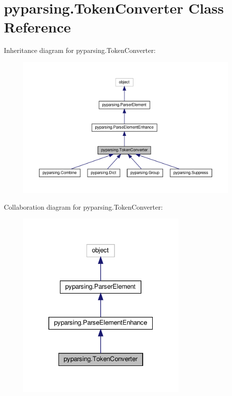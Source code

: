 \hypertarget{classpyparsing_1_1TokenConverter}{}\section{pyparsing.\+Token\+Converter Class Reference}
\label{classpyparsing_1_1TokenConverter}


Inheritance diagram for pyparsing.\+Token\+Converter\+:
\nopagebreak
\begin{figure}[H]
\begin{center}
\leavevmode
\includegraphics[width=350pt]{classpyparsing_1_1TokenConverter__inherit__graph}
\end{center}
\end{figure}


Collaboration diagram for pyparsing.\+Token\+Converter\+:
\nopagebreak
\begin{figure}[H]
\begin{center}
\leavevmode
\includegraphics[width=241pt]{classpyparsing_1_1TokenConverter__coll__graph}
\end{center}
\end{figure}
